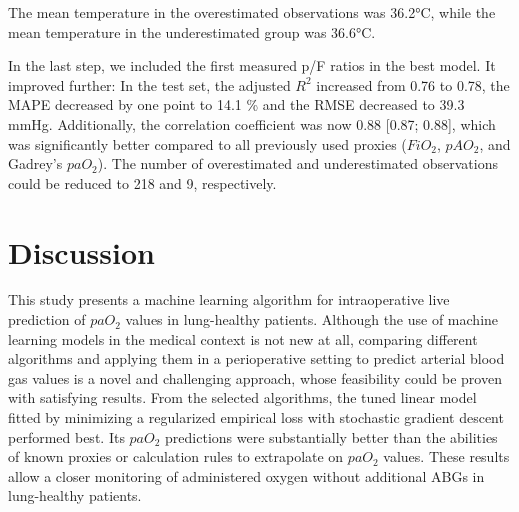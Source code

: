 \documentclass[referee,lineno,pdflatex,sn-nature]{sn-jnl}%
\theoremstyle{thmstyleone}%
\theoremstyle{thmstyletwo}%
\theoremstyle{thmstylethree}%
\begin{document}
The mean temperature in the overestimated observations was 36.2°C, while the mean temperature in the underestimated group was 36.6°C. 


In the last step, we included the first measured p/F ratios in the best model. It improved further: In the test set, the adjusted $R^2$ increased from 0.76 to 0.78, the MAPE decreased by one point to 14.1 \% and the RMSE decreased to 39.3 mmHg. Additionally, the correlation coefficient was now 0.88 [0.87; 0.88], which was significantly better compared to all previously used proxies ($FiO_2$, $pAO_2$, and Gadrey’s $paO_2$). The number of overestimated and underestimated observations could be reduced to 218 and 9, respectively. 

\section{Discussion}\label{sec4}

This study presents a machine learning algorithm for intraoperative live prediction of $paO_2$ values in lung-healthy patients. Although the use of machine learning models in the medical context is not new at all, comparing different algorithms and applying them in a perioperative setting to predict arterial blood gas values is a novel and challenging approach, whose feasibility could be proven with satisfying results. From the selected algorithms, the tuned linear model fitted by minimizing a regularized empirical loss with stochastic gradient descent performed best. Its $paO_2$ predictions were substantially better than the abilities of known proxies or calculation rules to extrapolate on $paO_2$ values. These results allow a closer monitoring of administered oxygen without additional ABGs in lung-healthy patients.
\end{document}
